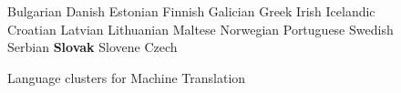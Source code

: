 \begin{multicols}{2}
\begin{figure}[htb]
\begin{tabular}
Bulgarian \newline 
Danish \newline 
Estonian \newline 
Finnish \newline 
Galician \newline 
Greek \newline 
Irish \newline 
Icelandic \newline 
Croatian \newline 
Latvian \newline 
Lithuanian \newline 
Maltese \newline 
Norwegian \newline 
Portuguese \newline 
Swedish \newline 
Serbian \newline 
\textbf{Slovak} \newline 
Slovene \newline 
Czech \newline
\end{tabular}
\label{fig:mt_cluster_en}
\caption{Language clusters for Machine Translation}
\end{figure}
  

\end{multicols}
